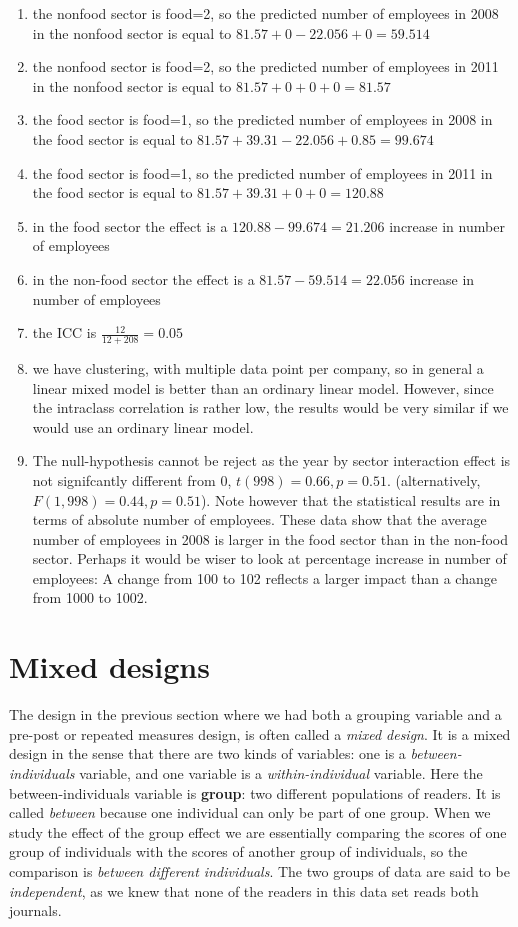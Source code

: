 \documentclass[]{report}\usepackage[]{graphicx}\usepackage[]{color}
\begin{document}
\begin{enumerate}
\item the nonfood sector is food=2, so the predicted number of employees in 2008 in the nonfood sector is equal to $81.57 + 0 -22.056 + 0= 59.514$
\item the nonfood sector is food=2, so the predicted number of employees in 2011 in the nonfood sector is equal to $81.57 + 0 + 0 + 0= 81.57$
\item the food sector is food=1, so the predicted number of employees in 2008 in the food sector is equal to $81.57 + 39.31 -22.056 + 0.85=99.674 $
\item the food sector is food=1, so the predicted number of employees in 2011 in the food sector is equal to $81.57 + 39.31 + 0 + 0 = 120.88   $ 
\item in the food sector the effect is a $120.88 - 99.674 =   21.206$ increase in number of employees
\item in the non-food sector the effect is a $81.57 - 59.514 =   22.056$ increase in number of employees
\item the ICC is $\frac{12}{12+208}=0.05$
\item we have clustering, with multiple data point per company, so in general a linear mixed model is better than an ordinary linear model. However, since the intraclass correlation is rather low, the results would be very similar if we would use an ordinary linear model.
\item The null-hypothesis cannot be reject as the year by sector interaction effect is not signifcantly different from 0, $t(998)=0.66, p=0.51$. (alternatively, $F(1,998)=0.44, p=0.51$). Note however that the statistical results are in terms of absolute number of employees. These data show that the average number of employees in 2008 is larger in the food sector than in the non-food sector. Perhaps it would be wiser to look at percentage increase in number of employees: A change from 100 to 102 reflects a larger impact than a change from 1000 to 1002.

\end{enumerate}





\section{Mixed designs}
The design in the previous section where we had both a grouping variable and a pre-post or repeated measures design, is often called a \textit{mixed design}. It is a mixed design in the sense that there are two kinds of variables: one is a \textit{between-individuals} variable, and one variable is a \textit{within-individual} variable. Here the between-individuals variable is \textbf{group}: two different populations of readers. It is called \textit{between} because one individual can only be part of one group. When we study the effect of the group effect we are essentially comparing the scores of one group of individuals with the scores of another group of individuals, so the comparison is \textit{between different individuals}. 
The two groups of data are said to be \textit{independent}, as we knew that none of the readers in this data set reads both journals. 
\end{document}

